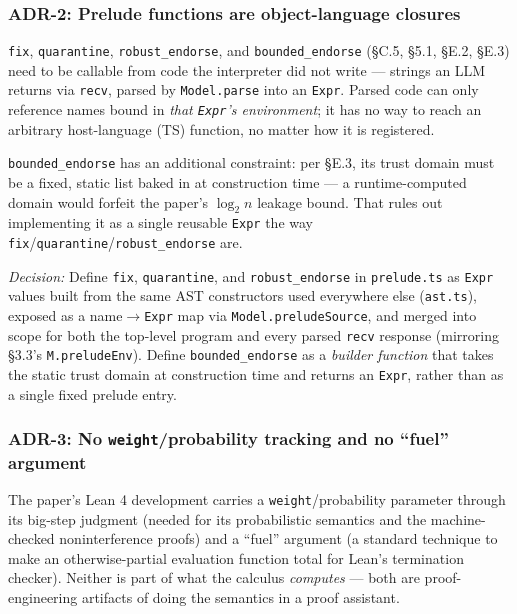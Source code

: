 \documentclass[11pt, a4paper]{article}
\begin{document}
\subsubsection{ADR-2: Prelude functions are object-language closures}

\texttt{fix}, \texttt{quarantine}, \texttt{robust\_endorse}, and
\texttt{bounded\_endorse} (§C.5, §5.1, §E.2, §E.3) need to be callable from
code the interpreter did not write --- strings an LLM returns via
\texttt{recv}, parsed by \texttt{Model.parse} into an \texttt{Expr}. Parsed
code can only reference names bound in \emph{that \texttt{Expr}'s environment};
it has no way to reach an arbitrary host-language (TS) function, no matter how
it is registered.

\texttt{bounded\_endorse} has an additional constraint: per §E.3, its trust
domain must be a fixed, static list baked in at construction time --- a
runtime-computed domain would forfeit the paper's $\log_2 n$ leakage bound.
That rules out implementing it as a single reusable \texttt{Expr} the way
\texttt{fix}/\texttt{quarantine}/\texttt{robust\_endorse} are.

\emph{Decision:} Define \texttt{fix}, \texttt{quarantine}, and
\texttt{robust\_endorse} in \texttt{prelude.ts} as \texttt{Expr} values built
from the same AST constructors used everywhere else (\texttt{ast.ts}), exposed
as a name$\to$\texttt{Expr} map via \texttt{Model.preludeSource}, and merged
into scope for both the top-level program and every parsed \texttt{recv}
response (mirroring §3.3's \texttt{M.preludeEnv}). Define
\texttt{bounded\_endorse} as a \emph{builder function} that takes the static
trust domain at construction time and returns an \texttt{Expr}, rather than as
a single fixed prelude entry.


\subsubsection{ADR-3: No \texttt{weight}/probability tracking and no ``fuel''
argument}

The paper's Lean 4 development carries a \texttt{weight}/probability parameter
through its big-step judgment (needed for its probabilistic semantics and the
machine-checked noninterference proofs) and a ``fuel'' argument (a standard
technique to make an otherwise-partial evaluation function total for Lean's
termination checker). Neither is part of what the calculus \emph{computes} ---
both are proof-engineering artifacts of doing the semantics in a proof
assistant.
\end{document}
